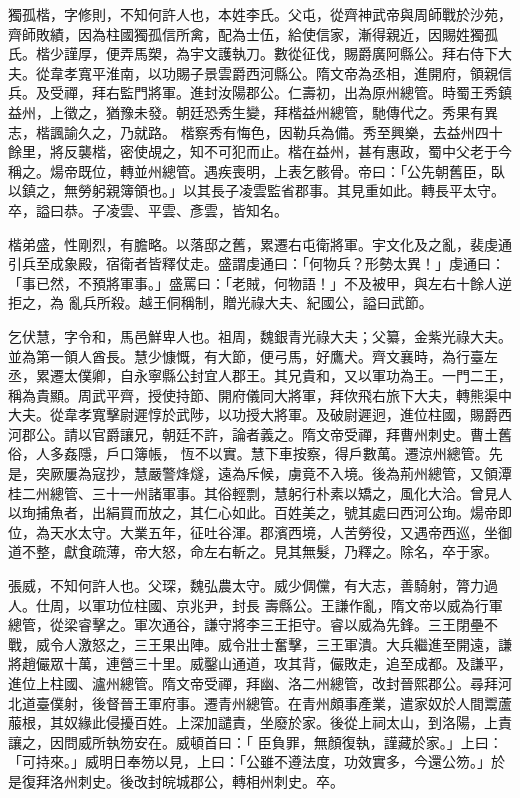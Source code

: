 \begin{pinyinscope}
 獨孤楷，字修則，不知何許人也，本姓李氏。父屯，從齊神武帝與周師戰於沙苑，齊師敗績，因為柱國獨孤信所禽，配為士伍，給使信家，漸得親近，因賜姓獨孤氏。楷少謹厚，便弄馬槊，為宇文護執刀。數從征伐，賜爵廣阿縣公。拜右侍下大夫。從韋孝寬平淮南，以功賜子景雲爵西河縣公。隋文帝為丞相，進開府，領親信兵。及受禪，拜右監門將軍。進封汝陽郡公。仁壽初，出為原州總管。時蜀王秀鎮益州，上徵之，猶豫未發。朝廷恐秀生變，拜楷益州總管，馳傳代之。秀果有異志，楷諷諭久之，乃就路。
 楷察秀有悔色，因勒兵為備。秀至興樂，去益州四十餘里，將反襲楷，密使覘之，知不可犯而止。楷在益州，甚有惠政，蜀中父老于今稱之。煬帝既位，轉並州總管。遇疾喪明，上表乞骸骨。帝曰：「公先朝舊臣，臥以鎮之，無勞躬親簿領也。」以其長子凌雲監省郡事。其見重如此。轉長平太守。卒，謚曰恭。子凌雲、平雲、彥雲，皆知名。



 楷弟盛，性剛烈，有膽略。以落邸之舊，累遷右屯衛將軍。宇文化及之亂，裴虔通引兵至成象殿，宿衛者皆釋仗走。盛謂虔通曰：「何物兵？形勢太異！」虔通曰：「事已然，不預將軍事。」盛罵曰：「老賊，何物語！」不及被甲，與左右十餘人逆拒之，為
 亂兵所殺。越王侗稱制，贈光祿大夫、紀國公，謚曰武節。



 乞伏慧，字令和，馬邑鮮卑人也。祖周，魏銀青光祿大夫；父纂，金紫光祿大夫。並為第一領人酋長。慧少慷慨，有大節，便弓馬，好鷹犬。齊文襄時，為行臺左丞，累遷太僕卿，自永寧縣公封宜人郡王。其兄貴和，又以軍功為王。一門二王，稱為貴顯。周武平齊，授使持節、開府儀同大將軍，拜佽飛右旅下大夫，轉熊渠中大夫。從韋孝寬擊尉遲惇於武陟，以功授大將軍。及破尉遲迥，進位柱國，賜爵西河郡公。請以官爵讓兄，朝廷不許，論者義之。隋文帝受禪，拜曹州刺史。曹土舊俗，人多姦隱，戶口簿帳，
 恆不以實。慧下車按察，得戶數萬。遷涼州總管。先是，突厥屢為寇抄，慧嚴警烽燧，遠為斥候，虜竟不入境。後為荊州總管，又領潭桂二州總管、三十一州諸軍事。其俗輕剽，慧躬行朴素以矯之，風化大洽。曾見人以珣捕魚者，出絹買而放之，其仁心如此。百姓美之，號其處曰西河公珣。煬帝即位，為天水太守。大業五年，征吐谷渾。郡濱西境，人苦勞役，又遇帝西巡，坐御道不整，獻食疏薄，帝大怒，命左右斬之。見其無髮，乃釋之。除名，卒于家。



 張威，不知何許人也。父琛，魏弘農太守。威少倜儻，有大志，善騎射，膂力過人。仕周，以軍功位柱國、京兆尹，封長
 壽縣公。王謙作亂，隋文帝以威為行軍總管，從梁睿擊之。軍次通谷，謙守將李三王拒守。睿以威為先鋒。三王閉壘不戰，威令人激怒之，三王果出陣。威令壯士奮擊，三王軍潰。大兵繼進至開遠，謙將趙儼眾十萬，連營三十里。威鑿山通道，攻其背，儼敗走，追至成都。及謙平，進位上柱國、瀘州總管。隋文帝受禪，拜幽、洛二州總管，改封晉熙郡公。尋拜河北道臺僕射，後督晉王軍府事。遷青州總管。在青州頗事產業，遣家奴於人間鬻蘆菔根，其奴緣此侵擾百姓。上深加譴責，坐廢於家。後從上祠太山，到洛陽，上責讓之，因問威所執笏安在。威頓首曰：「
 臣負罪，無顏復執，謹藏於家。」上曰：「可持來。」威明日奉笏以見，上曰：「公雖不遵法度，功效實多，今還公笏。」於是復拜洛州刺史。後改封皖城郡公，轉相州刺史。卒。




\end{pinyinscope}
